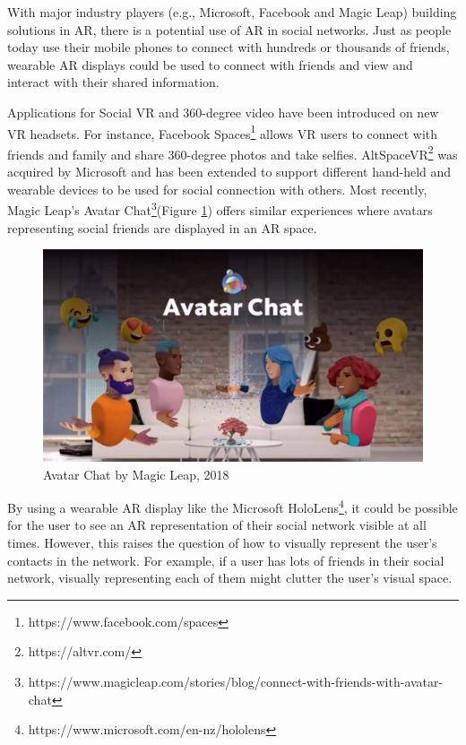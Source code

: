 
With major industry players (e.g., Microsoft, Facebook and Magic Leap) building solutions in AR, there is a potential use of AR in social networks. Just as people today use their mobile phones to connect with hundreds or thousands of friends, wearable AR displays could be used to connect with friends and view and interact with their shared information.

Applications for Social VR and 360-degree video have been introduced on new VR headsets. For instance, Facebook Spaces\footnote{https://www.facebook.com/spaces} allows VR users to connect with friends and family and share 360-degree photos and take selfies. AltSpaceVR\footnote{https://altvr.com/} was acquired by Microsoft and has been extended to support different hand-held and wearable devices to be used for social connection with others. Most recently, Magic Leap's Avatar Chat\footnote{https://www.magicleap.com/stories/blog/connect-with-friends-with-avatar-chat}(Figure \ref{fig:ml-avatar-chat}) offers similar experiences where avatars representing social friends are displayed in an AR space. 

\begin{figure}
    \centering
    \includegraphics[width=.8\linewidth]{images/magic-leap-avatar-chat.jpg}
    \caption{Avatar Chat by Magic Leap, 2018}
    \label{fig:ml-avatar-chat}
\end{figure}

By using a wearable AR display like the Microsoft HoloLens\footnote{https://www.microsoft.com/en-nz/hololens}, it could be possible for the user to see an AR representation of their social network visible at all times. However, this raises the question of how to visually represent the user's contacts in the network. For example, if a user has lots of friends in their social network, visually representing each of them might clutter the user's visual space.


